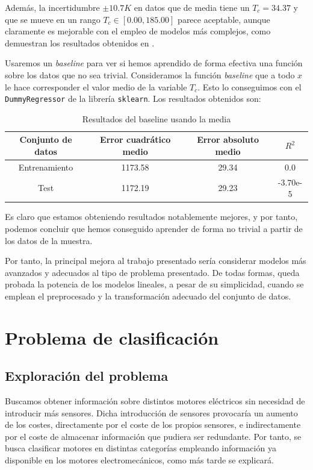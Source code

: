 \documentclass[11pt]{article}
\begin{document}
Además, la incertidumbre $\pm 10.7 K$ en datos que de media tiene un $T_c = 34.37$ y que se mueve en un rango $T_c \in [0.00, 185.00]$ parece aceptable, aunque claramente es mejorable con el empleo de modelos más complejos, como demuestran los resultados obtenidos en \cite{original_paper_reg:paper}.

Usaremos un \emph{baseline} para ver si hemos aprendido de forma efectiva una función sobre los datos que no sea trivial. Consideramos la función \emph{baseline} que a todo $x$ le hace corresponder el valor medio de la variable $T_c$. Esto lo conseguimos con el \lstinline{DummyRegressor} de la librería \lstinline{sklearn}. Los resultados obtenidos son:

\begin{table}[H]
\centering
\begin{tabular}{|c|c|c|c|}
    \hline
    \textbf{Conjunto de datos} & \textbf{Error cuadrático medio} & \textbf{Error absoluto medio} & \textbf{$R^2$} \\
    \hline
    Entrenamiento & 1173.58 & 29.34 &  0.0 \\
    Test & 1172.19 & 29.23 & -3.70e-5 \\
    \hline
\end{tabular}
    \caption{Resultados del baseline usando la media}
\end{table}

Es claro que estamos obteniendo resultados notablemente mejores, y por tanto, podemos concluir que hemos conseguido aprender de forma no trivial a partir de los datos de la muestra.

Por tanto, la principal mejora al trabajo presentado sería considerar modelos más avanzados y adecuados al tipo de problema presentado. De todas formas, queda probada la potencia de los modelos lineales, a pesar de su simplicidad, cuando se emplean el preprocesado y la transformación adecuado del conjunto de datos.

\pagebreak
\section{Problema de clasificación}

\subsection{Exploración del problema}

Buscamos obtener información sobre distintos motores eléctricos sin necesidad de introducir más sensores. Dicha introducción de sensores provocaría un aumento de los costes, directamente por el coste de los propios sensores, e indirectamente por el coste de almacenar información que pudiera ser redundante. Por tanto, se busca clasificar motores en distintas categorías empleando información ya disponible en los motores electromecánicos, como más tarde se explicará.
\end{document}

